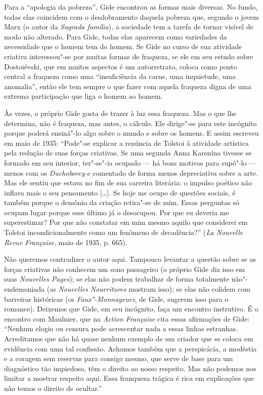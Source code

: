 Para a ``apologia da pobreza'', Gide encontrou as formas mais diversas.
No fundo, todas elas coincidem com o desdobramento daquela pobreza que,
segundo o jovem Marx (o autor da \emph{Sagrada família}), a sociedade
tem a tarefa de tornar visível de modo não alterado. Para Gide, todas elas
aparecem como variedades da necessidade que o homem tem do homem. Se
Gide no curso de sua atividade criativa interessou"-se por muitas formas
de fraqueza, se ele em seu estudo sobre Dostoiévski, que em muitos
aspectos é um autorretrato, coloca como ponto central a fraqueza como
uma ``insuficiência da carne, uma inquietude, uma anomalia'', então ele
tem sempre o que fazer com aquela fraqueza digna de uma extrema
participação que liga o homem ao homem.

Às vezes, o próprio Gide gosta de trazer à luz essa fraqueza. Mas o que
lhe determina, não é fraqueza, mas antes, o cálculo. Ele dirige"-se para
este incógnito porque poderá ensiná"-lo algo sobre o mundo e sobre os
homens. E assim escreveu em maio de 1935: ``Pode"-se explicar a renúncia
de Tolstoi à atividade artística pela redução de suas forças criativas.
Se uma segunda Anna Karenina tivesse se formado em seu interior,
ter"-se"-ia ocupado --- há bons motivos para supô"-lo --- menos com os
\emph{Duchoborcy} e comentado de forma menos depreciativa sobre a arte.
Mas ele sentiu que estava no fim de sua carreira literária: o impulso
poético não inflava mais o seu pensamento [\ldots{}]. Se hoje me ocupo de
questões sociais, é também porque o demônio da criação retira"-se de mim.
Essas perguntas só ocupam lugar porque esse último já o desocupou. Por
que eu deveria me superestimar? Por que não constatar em mim mesmo
aquilo que considerei em Tolstoi incondicionalmente como um fenômeno de
decadência?'' (\emph{La Nouvelle Revue Française}, maio de 1935, p.
665).

Não queremos contradizer o autor aqui. Tampouco levantar a questão sobre
se as forças criativas não conhecem um sono passageiro (o próprio Gide
diz isso em suas \emph{Nouvelles Pages}); se elas não podem trabalhar de
forma totalmente não"-endemoniada (as \emph{Nouvelles Nourritures}
mostram isso); se elas não colidem com barreiras históricas (os
\emph{Faux"-Monnayeurs}, de Gide, sugerem isso para o romance). Deixemos
que Gide, em seu incógnito, faça um encontro instrutivo. É o encontro
com Maulnier, que na \emph{Action Française} cita essas afirmações de
Gide: ``Nenhum elogio ou censura pode acrescentar nada a essas linhas
estranhas. Acreditamos que não há quase nenhum exemplo de um criador
que se coloca em evidência com uma tal confissão. Achamos também que a
perspicácia, a modéstia e a coragem sem reservas para consigo mesmo, que
serve de base para um diagnóstico tão impiedoso, têm o direito ao nosso
respeito. Mas não podemos nos limitar a mostrar respeito aqui. Essa
franqueza trágica é rica em explicações que não temos o direito de
ocultar.''

